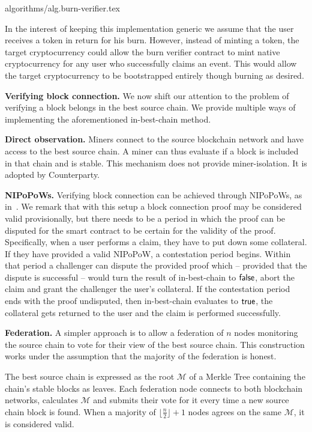{algorithms/alg.burn-verifier.tex}

In the interest of keeping this implementation generic we assume that the user receives a token in return for his burn. However, instead of minting a token, the target cryptocurrency could allow the burn verifier contract to mint native cryptocurrency for any user who successfully claims an event. This would allow the target cryptocurrency to be bootstrapped entirely though burning as desired.

\noindent
\textbf{Verifying block connection.}
We now shift our attention to the problem of verifying a block belongs in the best source chain. We provide multiple ways of implementing the aforementioned \textsf{in-best-chain} method.

\noindent
\textbf{Direct observation.}
Miners connect to the source blockchain network and have access to the best source chain. A miner can thus evaluate if a block is included in that chain and is stable. This mechanism does not provide miner-isolation. It is adopted by Counterparty.

\noindent
\textbf{NIPoPoWs.}
Verifying block connection can be achieved through NIPoPoWs, as in~\cite{pow-sidechains}.
We remark that with this setup a block connection proof may be considered valid provisionally, but there needs to be a period in which the proof can be disputed for the smart contract to be certain for the validity of the proof. Specifically, when a user performs a claim, they have to put down some collateral. If they have provided a valid NIPoPoW, a contestation period begins. Within that period a challenger can dispute the provided proof which -- provided that the dispute is successful -- would turn the result of \textsf{in-best-chain} to $\mathsf{false}$, abort the claim and grant the challenger the user's collateral. If the contestation period ends with the proof undisputed, then \textsf{in-best-chain} evaluates to $\mathsf{true}$, the collateral gets returned to the user and the claim is performed successfully.

\noindent
\textbf{Federation.}
A simpler approach is to allow a federation of $n$ nodes monitoring the source chain to vote for their view of the best source chain. This construction works under the assumption that the majority of the federation is honest.

The best source chain is expressed as the root $\mathcal{M}$ of a Merkle Tree containing the chain's stable blocks as leaves. Each federation node connects to both blockchain networks, calculates $\mathcal{M}$ and submits their vote for it every time a new source chain block is found. When a majority of $\lfloor\frac{n}{2}\rfloor + 1$ nodes agrees on the same $\mathcal{M}$, it is considered valid.

